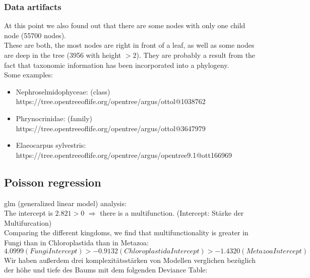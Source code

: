       \subsubsection{Data artifacts}
      At this point we also found out that there are some nodes with only one child node (55700 nodes). \\
      These are both, the most nodes are right in front of a leaf, as well as some nodes are deep in the 
        tree (3956 with height $>2$). They are probably a result from the fact that taxonomic information 
        has been incorporated into a phylogeny. \\
      Some examples:
      \begin{itemize}
        \item Nephroselmidophyceae: (class) \\
          https://tree.opentreeoflife.org/opentree/argus/ottol@1038762
        \item Phrynocrinidae: (family) \\
          https://tree.opentreeoflife.org/opentree/argus/ottol@3647979
        \item Elaeocarpus sylvestris: \\
          https://tree.opentreeoflife.org/opentree/argus/opentree9.1@ott166969
      \end{itemize}
     
      \subsection{Poisson regression}
        glm (generalized linear model) analysis: \\
      
        
        The intercept is $2.821 > 0$ $\Rightarrow$ there is a multifunction.
        (Intercept: Stärke der Multifurcation) \\
        Comparing the different kingdoms, we find that multifunctionality is greater in Fungi than in 
        Chloroplastida than in Metazoa:
        $$4.0999 (Fungi Intercept) > -0.9132 (Chloroplastida Intercept) > -1.4320 (Metazoa Intercept)$$
        Wir haben außerdem drei komplexitätsstärken von Modellen verglichen bezüglich der höhe und tiefe 
          des Baums mit dem folgenden Deviance Table:

